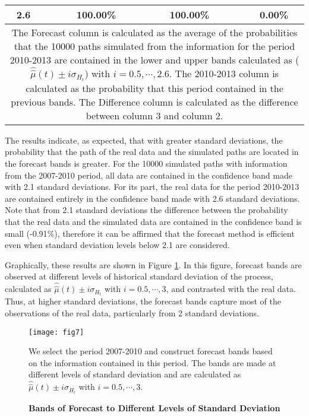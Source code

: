 \documentclass[12pt,halfline,a4paper]{ouparticle}
\begin{document}
\begin{table}[h]
\begin{tabular}{ccccccc}
		2.6   &       & 100.00\% &       & 100.00\% &       & 0.00\% \\	    
		\bottomrule
		\bottomrule
		\multicolumn{7}{p{11cm}}{\footnotesize{The Forecast column is calculated as the average of the probabilities that the 10000 paths simulated from the information for the period 2010-2013 are contained in the lower and upper bands calculated as ($\hat{\hat{\mu}}(t)\pm i\sigma_{H_{t}}$) with $i=0.5,\cdots,2.6$. The 2010-2013 column is calculated as the probability that this period contained in the previous bands. The Difference column is calculated as the difference between column 3 and column 2.}}
	\end{tabular}
	\label{tab:probab}
\end{table}

The results indicate, as expected, that with greater standard deviations, the probability that the path of the real data and the simulated paths are located in the forecast bands is greater. For the 10000 simulated paths with information from the 2007-2010 period, all data are contained in the confidence band made with 2.1 standard deviations. For its part, the real data for the period 2010-2013 are contained entirely in the confidence band made with 2.6 standard deviations. Note that from 2.1 standard deviations the difference between the probability that the real data and the simulated data are contained in the confidence band is small (-0.91$\%$), therefore it can be affirmed that the forecast method is efficient even when standard deviation levels below 2.1 are considered. 

Graphically, these results are shown in Figure \ref{fig:7}. In this figure, forecast bands are observed at different levels of historical standard deviation of the process, calculated as $\hat{\hat{\mu}}(t)\pm i\sigma_{H_{t}}$ with $i=0.5,\cdots,3$, and contrasted with the real data. Thus, at higher standard deviations, the forecast bands capture most of the observations of the real data, particularly from 2 standard deviations.

\begin{figure}[h]
	\centering
	\texttt{[image: fig7]}
	\caption{\textbf{Bands of Forecast to Different Levels of Standard Deviation}}
	\medskip
	\begin{minipage}{0.8\textwidth} 
		{\footnotesize{We select the period 2007-2010 and construct forecast bands based on the information contained in this period. The bands are made at different levels of standard deviation and are calculated as $\hat{\hat{\mu}}(t)\pm i\sigma_{H_{t}}$ with $i=0.5,\cdots,3$.\par}}
	\end{minipage}
	\label{fig:7}
\end{figure}
\end{document}
